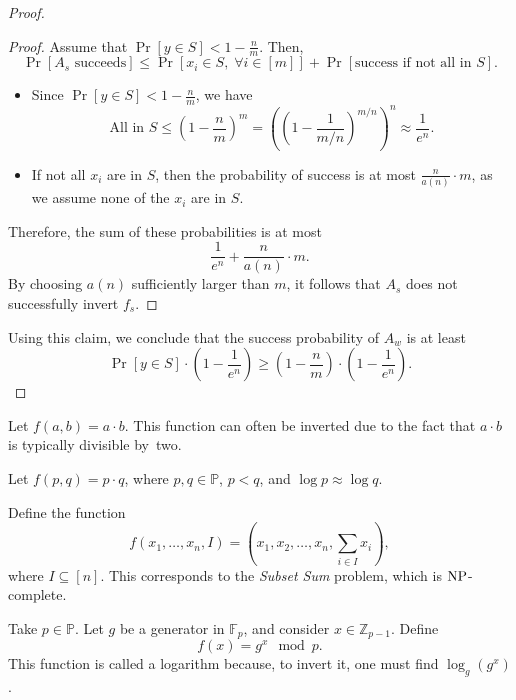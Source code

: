 \begin{proof}
    \begin{proof}
        Assume that $\Pr[y \in S] < 1 - \frac{n}{m}$.
        Then,
        \[
            \Pr[A_s \text{ succeeds}] \leq \Pr[x_i \in S, \; \forall i \in [m]] + \Pr[\text{success if not all in } S].
        \]
        \begin{itemize}
            \item Since $\Pr[y \in S] < 1 - \frac{n}{m}$, we have 
            \[
                \text{All in } S \leq \left( 1 - \frac{n}{m} \right)^{m}  = \left(\left(1 - \frac{1}{m/n}\right)^{m/n}\right)^n \approx \frac{1}{e^n}.
            \]
            \item If not all $x_i$ are in $S$, then the probability of success is at most $\frac{n}{a(n)} \cdot m$, as we assume none of the $x_i$ are in $S$.
        \end{itemize}
        Therefore, the sum of these probabilities is at most
        \[
            \frac{1}{e^{n}} + \frac{n}{a(n)} \cdot m.
        \]
        By choosing $a(n)$ sufficiently larger than $m$, it follows that $A_s$ does not successfully invert $f_s$.
    \end{proof}

    Using this claim, we conclude that the success probability of $A_w$ is at least
    \[
        \Pr[y \in S] \cdot \left(1 - \frac{1}{e^{n}}\right) \ge \left(1 - \frac{n}{m}\right) \cdot \left(1 - \frac{1}{e^{n}}\right).
    \]
\end{proof}

\begin{example}
    Let $f(a, b) = a \cdot b$.
    This function can often be inverted due to the fact that $a \cdot b$ is typically divisible by~two.
\end{example}

\begin{example}
    Let $f(p, q) = p \cdot q$, where $p, q \in \mathbb{P}$, $p < q$, and $\log p \approx \log q$.
\end{example}

\begin{example}
    Define the function
    \[
        f(x_1, \ldots, x_n, I) = (x_1, x_2, \ldots, x_n, \sum_{i \in I} x_i),
    \]
    where $I \subseteq [n]$.
	This corresponds to the \emph{Subset Sum} problem, which is $\operatorname{NP}$-complete.
\end{example}

\begin{example}
    Take $p \in \mathbb{P}$.
    Let $g$ be a generator in $\mathbb{F}_p$, and consider $x \in \mathbb{Z}_{p - 1}$.
    Define
    \[
        f(x) = g^x \mod p.
    \]
    This function is called a logarithm because, to invert it, one must find $\log_g(g^x)$.
\end{example}

